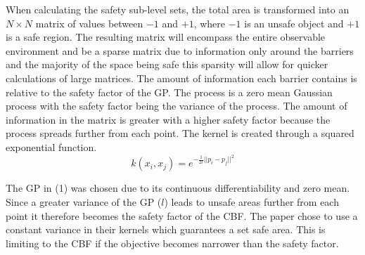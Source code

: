 \documentclass[conference]{IEEEtran}
\begin{document}
When calculating the safety sub-level sets, the total area is transformed into an $N \times N$ matrix of values between $-1$ and $+1$, where $-1$ is an unsafe object and $+1$ is a safe region. The resulting matrix will encompass the entire observable environment and be a sparse matrix due to information only around the barriers and the majority of the space being safe this sparsity will allow for quicker calculations of large matrices. The amount of information each barrier contains is relative to the safety factor of the GP. The process is a zero mean Gaussian process with the safety factor being the variance of the process. The amount of information in the matrix is greater with a higher safety factor because the process spreads further from each point. 
The kernel is created through a squared exponential function. 
\begin{equation}
k(x_i, x_j) =  e^{-\frac{1}{2l}||p_i - p_j||^2}
\end{equation}

The GP in (1) was chosen due to its continuous differentiability and zero mean. Since a greater variance of the GP ($l$) leads to unsafe areas further from each point it therefore becomes the safety factor of the CBF. The paper \cite{cbfgp} chose to use a constant variance in their kernels which guarantees a set safe area. This is limiting to the CBF if the objective becomes narrower than the safety factor. 
\end{document}
